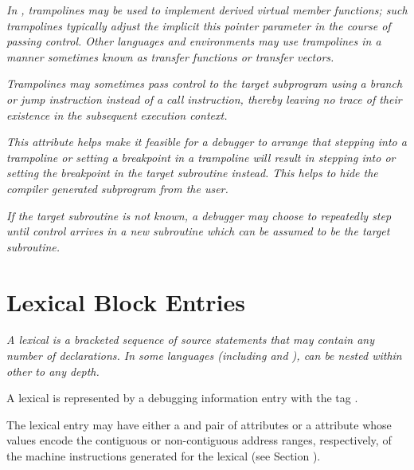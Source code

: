 \textit{In , trampolines may be used 
to implement derived virtual
member functions; such trampolines typically adjust the
implicit this pointer parameter in the course of passing
control.  
Other languages and environments may use trampolines
in a manner sometimes known as transfer functions or transfer
vectors.}

\textit{Trampolines may sometimes pass control to the target
subprogram using a branch or jump instruction instead of a
call instruction, thereby leaving no trace of their existence
in the subsequent execution context. }

\textit{This attribute helps make it feasible for a debugger to arrange
that stepping into a trampoline or setting a breakpoint in
a trampoline will result in stepping into or setting the
breakpoint in the target subroutine instead. This helps to
hide the compiler generated subprogram from the user. }

\textit{If the target subroutine is not known, a debugger may choose
to repeatedly step until control arrives in a new subroutine
which can be assumed to be the target subroutine. }



\section{Lexical Block Entries}
\label{chap:lexicalblockentries}

\textit{A 
lexical  
is 
a bracketed sequence of source statements
that may contain any number of declarations. In some languages
(including  and ),
 can be nested within other
 to any depth.}

A lexical  is represented by a debugging information
entry with the 
tag .

The lexical  
entry may have 
either a  and
 pair of 
attributes 
or 
a 
 attribute
whose values encode the contiguous or non-contiguous address
ranges, respectively, of the machine instructions generated
for the lexical  
(see Section ).

